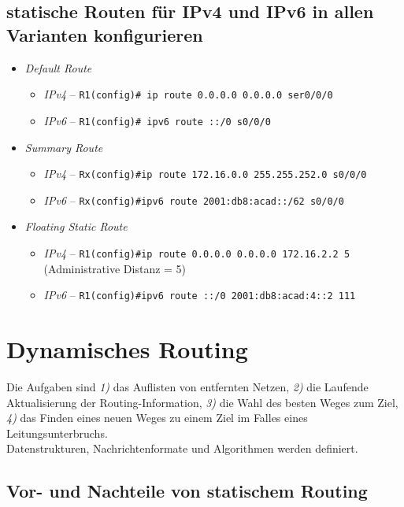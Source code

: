 \documentclass[a4paper,12pt]{article}
\begin{document}
\subsection{statische Routen für IPv4 und IPv6 in allen Varianten konfigurieren}
\begin{itemize}
\item \emph{Default Route}
    \begin{itemize}
    \item \emph{IPv4} -- \verb+R1(config)# ip route 0.0.0.0 0.0.0.0 ser0/0/0+
    \item \emph{IPv6} -- \verb+R1(config)# ipv6 route ::/0 s0/0/0+
    \end{itemize}
\item \emph{Summary Route}
    \begin{itemize}
    \item \emph{IPv4} -- \verb+Rx(config)#ip route 172.16.0.0 255.255.252.0 s0/0/0+
    \item \emph{IPv6} -- \verb+Rx(config)#ipv6 route 2001:db8:acad::/62 s0/0/0+
    \end{itemize}

\item \emph{Floating Static Route}
    \begin{itemize}
    \item \emph{IPv4} -- \verb+R1(config)#ip route 0.0.0.0 0.0.0.0 172.16.2.2 5+ (Administrative Distanz = 5)
    \item \emph{IPv6} -- \verb+R1(config)#ipv6 route ::/0 2001:db8:acad:4::2 111+
    \end{itemize}

\end{itemize}






\section{Dynamisches Routing}
Die Aufgaben sind \emph{1)} das Auflisten von entfernten Netzen, \emph{2)} die Laufende Aktualisierung der Routing-Information, \emph{3)} die Wahl des besten Weges zum Ziel, \emph{4)} das Finden eines neuen Weges zu einem Ziel im Falles eines Leitungsunterbruchs.\\

Datenstrukturen, Nachrichtenformate und Algorithmen werden definiert.

\subsection{Vor- und Nachteile von statischem Routing}
\end{document}
